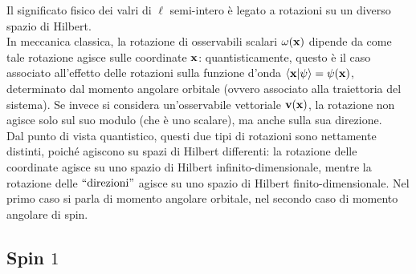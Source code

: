 Il significato fisico dei valri di $ \ell $ semi-intero è legato a rotazioni su un diverso spazio di Hilbert.\\
In meccanica classica, la rotazione di osservabili scalari $ \omega(\mathbf{x}) $ dipende da come tale rotazione agisce sulle coordinate $ \mathbf{x} $: quantisticamente, questo è il caso associato all'effetto delle rotazioni sulla funzione d'onda $ \braket{\mathbf{x} | \psi} = \psi(\mathbf{x}) $, determinato dal momento angolare orbitale (ovvero associato alla traiettoria del sistema).
Se invece si considera un'osservabile vettoriale $ \mathbf{v}(\mathbf{x}) $, la rotazione non agisce solo sul suo modulo (che è uno scalare), ma anche sulla sua direzione.\\
Dal punto di vista quantistico, questi due tipi di rotazioni sono nettamente distinti, poiché agiscono su spazi di Hilbert differenti: la rotazione delle coordinate agisce su uno spazio di Hilbert infinito-dimensionale, mentre la rotazione delle $ ``\text{direzioni}" $ agisce su uno spazio di Hilbert finito-dimensionale.
Nel primo caso si parla di momento angolare orbitale, nel secondo caso di momento angolare di spin.

\subsection{Spin \texorpdfstring{$ 1 $}{TEXT}}

